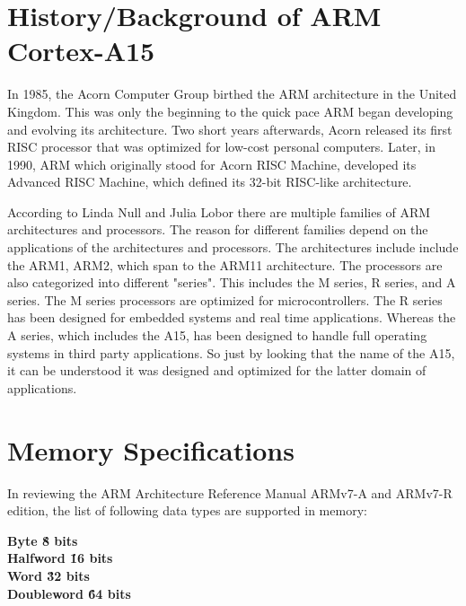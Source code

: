 \documentclass[12pt]{scrreprt}
\begin{document}
\tableofcontents



\chapter{History/Background of ARM Cortex-A15}

	In 1985, the Acorn Computer Group birthed the ARM architecture in the United Kingdom. This was only the beginning to
	the quick pace ARM began developing and evolving its architecture. Two short years afterwards, Acorn 
	released its first RISC processor that was optimized for low-cost personal computers. Later, in 1990, ARM 
	which originally stood for Acorn RISC Machine, developed its Advanced RISC Machine, which defined its 32-bit RISC-like
	architecture.

	According to Linda Null and Julia Lobor there are multiple families of ARM architectures and processors. The reason for different
	families depend on the applications of the architectures and processors. The architectures include include the ARM1, ARM2,
	which span to the ARM11 architecture. The processors are also categorized into different "series". This includes the
	M series, R series, and A series. The M series processors are optimized for microcontrollers. The R series has been designed
	for embedded systems and real time applications. Whereas the A series, which includes the A15, has been designed to handle
	full operating systems in third party applications. So just by looking that the name of the A15, it can be understood
	it was designed and optimized for the latter domain of applications.


{\let\clearpage\relax\chapter{Memory Specifications}}

	In reviewing the ARM Architecture Reference Manual ARMv7-A and ARMv7-R edition, the list of following data types are supported in memory:


	\begin{center}
		\bfseries Byte \' 8 bits\\
		\bfseries Halfword \' 16 bits\\
		\bfseries Word \' 32 bits\\
		\bfseries Doubleword \' 64 bits\\
	\end{center}
\end{document}
